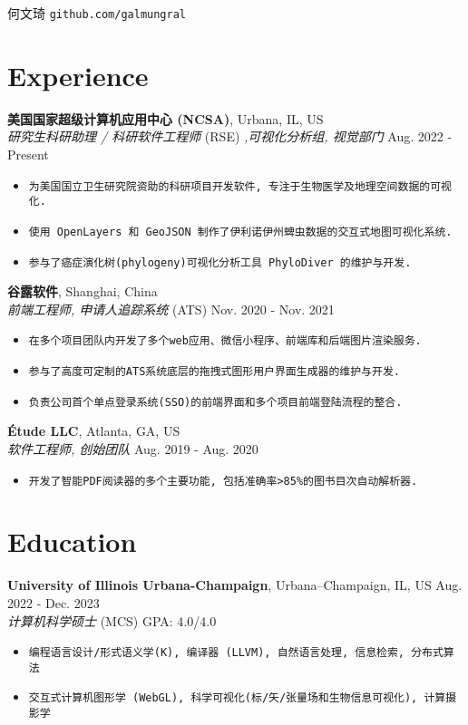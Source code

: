 \documentclass[12pt]{article}
\begin{document}
{\Huge 何文琦} \quad \texttt{github.com/galmungral}

\section*{Experience}

\textbf{美国国家超级计算机应用中心 (NCSA)}, Urbana, IL, US\\
\textit{研究生科研助理 / 科研软件工程师} (RSE) \textit{,可视化分析组, 视觉部门} \hfill Aug. 2022 - Present
\begin{itemize}
\item \texttt{为美国国立卫生研究院资助的科研项目开发软件, 专注于生物医学及地理空间数据的可视化.}
\item \texttt{使用 OpenLayers 和 GeoJSON 制作了伊利诺伊州蜱虫数据的交互式地图可视化系统.}
\item \texttt{参与了癌症演化树(phylogeny)可视化分析工具 PhyloDiver 的维护与开发.}
\end{itemize}

\textbf{谷露软件}, Shanghai, China\\
\textit{前端工程师, 申请人追踪系统} (ATS) \hfill Nov. 2020 - Nov. 2021
\begin{itemize}
\item \texttt{在多个项目团队内开发了多个web应用、微信小程序、前端库和后端图片渲染服务.}
\item \texttt{参与了高度可定制的ATS系统底层的拖拽式图形用户界面生成器的维护与开发.}
\item \texttt{负责公司首个单点登录系统(SSO)的前端界面和多个项目前端登陆流程的整合.}
\end{itemize}

\textbf{Étude LLC}, Atlanta, GA, US\\
\textit{软件工程师, 创始团队} \hfill Aug. 2019 - Aug. 2020
\begin{itemize}
\item \texttt{开发了智能PDF阅读器的多个主要功能, 包括准确率>85\%的图书目次自动解析器.}
\end{itemize}

\section*{Education}
\textbf{University of Illinois Urbana-Champaign}, Urbana–Champaign, IL, US \hfill Aug. 2022 - Dec. 2023 \\
\textit{计算机科学硕士} (MCS)  \hfill GPA: 4.0/4.0 
\begin{itemize}
\item \texttt{编程语言设计/形式语义学(K), 编译器 (LLVM), 自然语言处理, 信息检索, 分布式算法}
\item \texttt{交互式计算机图形学 (WebGL), 科学可视化(标/矢/张量场和生物信息可视化), 计算摄影学}
\end{itemize}
\end{document}
